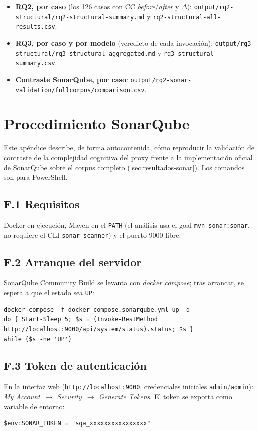 \begin{itemize}
  \item \textbf{RQ2, por caso} (los 126 casos con CC \emph{before}/\emph{after}
  y $\Delta$): \texttt{output/\allowbreak rq2-structural/\allowbreak rq2-structural-summary.md} y
  \texttt{rq2-structural-all-results.csv}.
  \item \textbf{RQ3, por caso y por modelo} (veredicto de cada invocación):
  \texttt{output/\allowbreak rq3-structural/\allowbreak rq3-structural-aggregated.md} y
  \texttt{rq3-structural-summary.csv}.
  \item \textbf{Contraste SonarQube, por caso}:
  \texttt{output/\allowbreak rq2-sonar-validation/\allowbreak fullcorpus/\allowbreak comparison.csv}.
\end{itemize}

\chapter{Procedimiento SonarQube}
\label{ap:sonarqube}
Este apéndice describe, de forma autocontenida, cómo reproducir la validación
de contraste de la complejidad cognitiva del proxy frente a la implementación
oficial de SonarQube sobre el corpus completo (\autoref{sec:resultados-sonar}).
Los comandos son para PowerShell.

\section*{F.1 Requisitos}
Docker en ejecución, Maven en el \texttt{PATH} (el análisis usa el goal
\texttt{mvn sonar:sonar}, no requiere el CLI \texttt{sonar-scanner}) y el puerto
9000 libre.

\section*{F.2 Arranque del servidor}
SonarQube Community Build se levanta con \emph{docker compose}; tras arrancar,
se espera a que el estado sea \texttt{UP}:
\begin{lstlisting}[language={},basicstyle=\footnotesize\ttfamily]
docker compose -f docker-compose.sonarqube.yml up -d
do { Start-Sleep 5; $s = (Invoke-RestMethod http://localhost:9000/api/system/status).status; $s }
while ($s -ne 'UP')
\end{lstlisting}

\section*{F.3 Token de autenticación}
En la interfaz web (\texttt{http://localhost:9000}, credenciales iniciales
\texttt{admin}/\texttt{admin}): \emph{My Account~$\rightarrow$ Security~$\rightarrow$
Generate Tokens}. El token se exporta como variable de entorno:
\begin{lstlisting}[language={},basicstyle=\footnotesize\ttfamily]
$env:SONAR_TOKEN = "sqa_xxxxxxxxxxxxxxxx"
\end{lstlisting}

